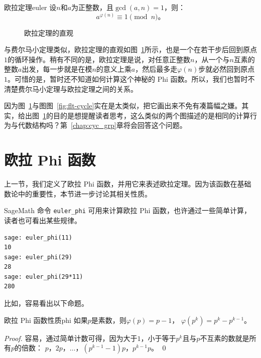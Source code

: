 \begin{theorem}{欧拉定理}{euler}
设$n$和$a$为正整数，且$\gcd(a, n) = 1$，则：
	$$a^{\varphi(n)} \equiv 1 \pmod{n}\text{。}$$
\end{theorem}

\begin{figure}[htbp]
	\centering
	
	\caption{欧拉定理的直观}
	\label{fig:euler-cycle}
\end{figure}

与费尔马小定理类似，欧拉定理的直观如图~\ref{fig:euler-cycle}所示，也是一个在若干步后回到原点$1$的循环操作。稍有不同的是，欧拉定理是说，对任意正整数$n$，从一个与$n$互素的整数$a$出发，每一步就是在模$n$的意义上乘$a$，然后最多走$\varphi(n)$步就必然回到原点$1$。可惜的是，暂时还不知道如何计算这个神秘的 Phi 函数。所以，我们也暂时不清楚费尔马小定理与欧拉定理之间的关系。

\begin{thinking}
	因为图~\ref{fig:euler-cycle}与图图~\ref{fig:flt-cycle}实在是太类似，把它画出来不免有凑篇幅之嫌。其实，给出图~\ref{fig:euler-cycle}的目的是想提醒读者思考，这么类似的两个图描述的是相同的计算行为与代数结构吗？第~\ref{chap:cyc_grp}章将会回答这个问题。
\end{thinking}

\section{欧拉 Phi 函数}
\label{sec:phi}
上一节，我们定义了欧拉 Phi 函数，并用它来表述欧拉定理。因为该函数在基础数论中的重要性，本节进一步讨论其相关性质。

SageMath 命令 \lstinline{euler_phi} 可用来计算欧拉 Phi 函数，也许通过一些简单计算，读者也可看出某些规律。
\begin{lstlisting}
sage: euler_phi(11)
10
sage: euler_phi(29)
28
sage: euler_phi(29*11)
280
\end{lstlisting}
比如，容易看出以下命题。

\begin{proposition}{欧拉 Phi 函数性质}{phi}
    如果$p$是素数，则$\varphi(p) = p - 1$，
    $\varphi(p^k) = p^k - p^{k-1}$。
\end{proposition}

\begin{proof}
	容易，通过简单计数可得，因为大于$1$，小于等于$p^k$且与$p$不互素的数就是所有$p$的倍数：
	$p$，$2p$，$\ldots$，$(p^{k-1}-1)p$，$p^{k-1}p$。 \qed
\end{proof}


